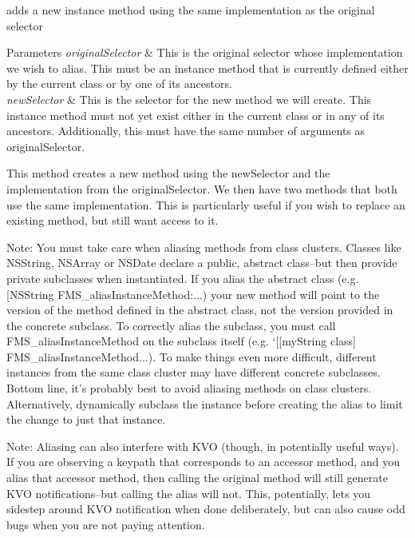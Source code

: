 adds a new instance method using the same implementation as the original selector 


\begin{DoxyParams}{Parameters}
{\em original\-Selector} & This is the original selector whose implementation we wish to alias. This must be an instance method that is currently defined either by the current class or by one of its ancestors.\\
\hline
{\em new\-Selector} & This is the selector for the new method we will create. This instance method must not yet exist either in the current class or in any of its ancestors. Additionally, this must have the same number of arguments as {\ttfamily original\-Selector}.\\
\hline
\end{DoxyParams}
This method creates a new method using the {\ttfamily new\-Selector} and the implementation from the {\ttfamily original\-Selector}. We then have two methods that both use the same implementation. This is particularly useful if you wish to replace an existing method, but still want access to it.

Note\-: You must take care when aliasing methods from class clusters. Classes like N\-S\-String, N\-S\-Array or N\-S\-Date declare a public, abstract class--but then provide private subclasses when instantiated. If you alias the abstract class (e.\-g. {\ttfamily \mbox{[}N\-S\-String F\-M\-S\-\_\-alias\-Instance\-Method\-:...}) your new method will point to the version of the method defined in the abstract class, not the version provided in the concrete subclass. To correctly alias the subclass, you must call {\ttfamily F\-M\-S\-\_\-alias\-Instance\-Method} on the subclass itself (e.\-g. `\mbox{[}\mbox{[}my\-String class\mbox{]} F\-M\-S\-\_\-alias\-Instance\-Method...). To make things even more difficult, different instances from the same class cluster may have different concrete subclasses. Bottom line, it's probably best to avoid aliasing methods on class clusters. Alternatively, dynamically subclass the instance before creating the alias to limit the change to just that instance.

Note\-: Aliasing can also interfere with K\-V\-O (though, in potentially useful ways). If you are observing a keypath that corresponds to an accessor method, and you alias that accessor method, then calling the original method will still generate K\-V\-O notifications--but calling the alias will not. This, potentially, lets you sidestep around K\-V\-O notification when done deliberately, but can also cause odd bugs when you are not paying attention.

